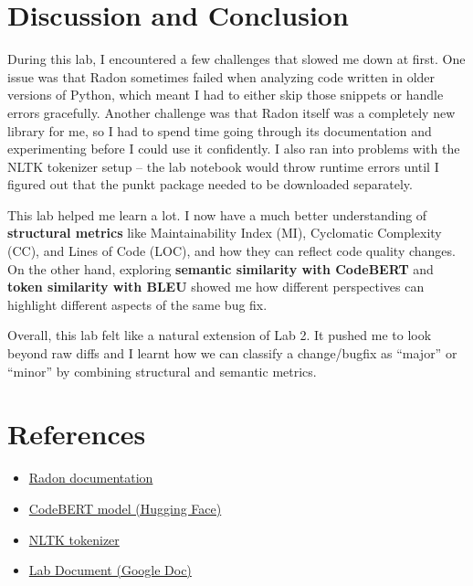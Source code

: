 \documentclass[10pt,a4paper]{report}
\begin{document}
\section{Discussion and Conclusion}

During this lab, I encountered a few challenges that slowed me down at first. One issue was that Radon sometimes failed when analyzing code written in older versions of Python, which meant I had to either skip those snippets or handle errors gracefully. Another challenge was that Radon itself was a completely new library for me, so I had to spend time going through its documentation and experimenting before I could use it confidently. I also ran into problems with the NLTK tokenizer setup -- the lab notebook would throw runtime errors until I figured out that the punkt package needed to be downloaded separately.

This lab helped me learn a lot. I now have a much better understanding of \textbf{structural metrics} like Maintainability Index (MI), Cyclomatic Complexity (CC), and Lines of Code (LOC), and how they can reflect code quality changes. On the other hand, exploring \textbf{semantic similarity with CodeBERT} and \textbf{token similarity with BLEU} showed me how different perspectives can highlight different aspects of the same bug fix.

Overall, this lab felt like a natural extension of Lab 2. It pushed me to look beyond raw diffs and I learnt how we can classify a change/bugfix as ``major'' or ``minor'' by combining structural and semantic metrics.


\section{References}
\begin{itemize}[itemsep=0.05em, topsep=0pt]
    \item \href{https://pypi.org/project/radon}{Radon documentation}
    \item \href{https://huggingface.co/microsoft/codebert-base}{CodeBERT model (Hugging Face)}
    \item \href{https://www.nltk.org/}{NLTK tokenizer}
    \item \href{https://drive.google.com/file/d/1erOvLfZuDeQw798jfHmX3t9MtKl8xmsN/view}{Lab Document (Google Doc)}
\end{itemize}
\end{document}
